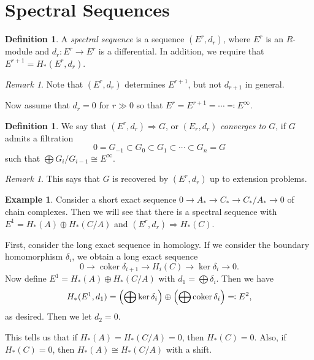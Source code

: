 \documentclass[leqno, openany]{memoir}
\theoremstyle{definition}
\newtheorem{defn}[thm]{Definition}
\newtheorem{exm}[thm]{Example}
\theoremstyle{remark}
\newtheorem{rmk}[thm]{Remark}
\theoremstyle{plain}
\theoremstyle{definition}
\theoremstyle{remark}
\begin{document}
\section{Spectral Sequences}%
\label{sec:spectral_sequences}

\begin{defn}
    A \textit{spectral sequence} is a sequence $(E^r, d_r)$, where $E^r$ is an $R$-module and $d_r \colon E^r \to E^r$ is a differential. In addition, we require that $E^{r+1} = H_*(E^r, d_r)$. 
\end{defn}

\begin{rmk}
    Note that $(E^r, d_r)$ determines $E^{r+1}$, but not $d_{r+1}$ in general.
\end{rmk}

Now assume that $d_r = 0$ for $r \gg 0$ so that $E^r = E^{r+1} = \cdots \eqqcolon E^{\infty}$.

\begin{defn}
    We say that $(E^r, d_r) \Rightarrow G$, or $(E_r, d_r)$ \textit{converges to $G$}, if $G$ admits a filtration
    \[ 0 = G_{-1} \subset G_0 \subset G_1 \subset \cdots \subset G_n = G \] such that $\bigoplus G_i / G_{i-1} \cong E^{\infty}$.
\end{defn}

\begin{rmk}
    This says that $G$ is recovered by $(E^r, d_r)$ up to extension problems.
\end{rmk}

\begin{exm}
    Consider a short exact sequence $0 \to A_* \to C_* \to C_*/A_* \to 0$ of chain complexes. Then we will see that there is a spectral sequence with $E^1 = H_*(A) \oplus H_*(C/A)$ and $(E^r, d_r) \Rightarrow H_*(C)$. 

    First, consider the long exact sequence in homology. If we consider the boundary homomorphism $\delta_i$, we obtain a long exact sequence
    \[ 0 \to \operatorname{coker} \delta_{i+1} \to H_i(C) \to \ker \delta_i \to 0. \]
    Now define $E^1 = H_*(A) \oplus H_*(C / A)$ with $d_1 = \bigoplus \delta_i$. Then we have 
    \[ H_*(E^1, d_1) = \qty( \bigoplus \ker \delta_i ) \oplus \qty(\bigoplus \operatorname{coker} \delta_i) \eqqcolon E^2, \]
    as desired. Then we let $d_2 = 0$.
\end{exm}

This tells us that if $H_*(A) = H_*(C/A) = 0$, then $H_*(C) = 0$. Also, if $H_*(C) = 0$, then $H_*(A) \cong H_*(C/A)$ with a shift.
\end{document}
